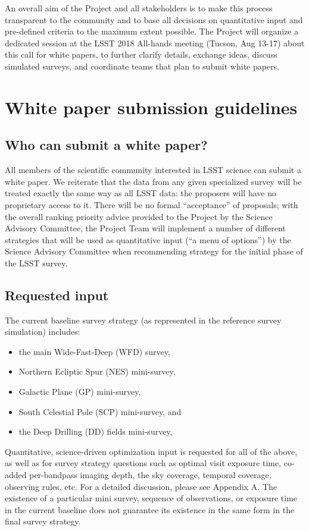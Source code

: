 \documentclass[DM,lsstdraft,toc,usenatbib]{lsstdoc}
\begin{document}
An overall aim of the Project and all stakeholders is to make this process transparent to the community and to base 
all decisions on quantitative input and pre-defined criteria to the maximum extent possible. 
The Project will organize a dedicated session at the LSST 2018 All-hands meeting (Tucson, Aug 13-17)
about this call for white papers, to further clarify  details, exchange ideas, discuss simulated surveys, 
and coordinate teams that plan to submit white papers. 


\section{White paper submission guidelines} 


\subsection{Who can submit a white paper?} 

All members of the scientific community interested in LSST science can submit a white paper. 
We reiterate that the data from any given specialized survey will be treated exactly the same 
way as all LSST data: the proposers will have no proprietary access to it. There will be no 
formal ``acceptance'' of proposals; with the overall ranking priority advice provided to the 
Project by the Science Advisory Committee, the Project Team will implement a number of
different strategies that will be used as quantitative input (``a menu of options'') by the 
Science Advisory Committee when recommending strategy for the initial phase of the LSST survey. 


\subsection{Requested input \label{sec:reqinput}}

The current baseline survey strategy (as represented in the reference survey simulation) includes:
\begin{itemize}
\item the main Wide-Fast-Deep (WFD) survey,
\item Northern Ecliptic Spur (NES) mini-survey, 
\item Galactic Plane (GP) mini-survey,
\item South Celestial Pole (SCP) mini-survey, and
\item the Deep Drilling (DD) fields mini-survey,
\end{itemize}
Quantitative, science-driven optimization input is requested for all of the above, as well as 
for survey strategy questions such as optimal visit exposure time,
co-added per-bandpass imaging depth, the sky coverage, temporal coverage, observing
rules, etc.  For a detailed discussion, please see Appendix A. The existence of a particular
mini survey, sequence of observations, or exposure time in the current baseline does not 
guarantee its existence in the same form in the final survey strategy. 
\end{document}

